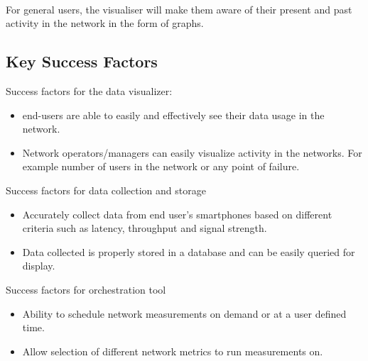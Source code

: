 \paragraph{}
For general users, the visualiser will make them aware of their present and past activity in the network in the form of graphs.
\subsection{Key Success Factors}
Success factors for the data visualizer:
\begin{itemize}
	\item end-users are able to easily and effectively see their data usage in the network.
	\item Network operators/managers can easily visualize activity in the networks. For example number of users in the network or any point of failure. 
\end{itemize}
Success factors for data collection and storage
\begin{itemize}
	\item Accurately collect data from end user's smartphones based on different criteria such as latency, throughput and signal strength.
	\item Data collected is properly stored in a database and can be easily queried for display.
\end{itemize}
Success factors for orchestration tool
\begin{itemize}
	\item Ability to schedule network measurements on demand or at a user defined time.
	\item Allow selection of different network metrics to run measurements on. 
\end{itemize} 


